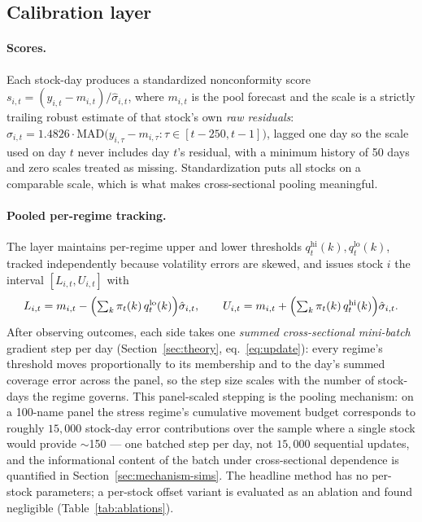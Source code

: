 \subsection{Calibration layer}

\paragraph{Scores.} Each stock-day produces a standardized nonconformity
score $s_{i,t} = (y_{i,t} - m_{i,t}) / \hat\sigma_{i,t}$, where $m_{i,t}$
is the pool forecast and the scale is a strictly trailing robust estimate
of that stock's own \emph{raw residuals}:
$\hat\sigma_{i,t} = 1.4826 \cdot \mathrm{MAD}\bigl( y_{i,\tau} - m_{i,\tau}
: \tau \in [t - 250, t - 1] \bigr)$, lagged one day so the scale used on
day $t$ never includes day $t$'s residual, with a minimum history of 50
days and zero scales treated as missing. Standardization puts all stocks
on a comparable scale, which is what makes cross-sectional pooling
meaningful.

\paragraph{Pooled per-regime tracking.} The layer maintains per-regime
upper and lower thresholds $q_t^{\mathrm{hi}}(k), q_t^{\mathrm{lo}}(k)$,
tracked independently because volatility errors are skewed, and issues
stock $i$ the interval $[L_{i,t}, U_{i,t}]$ with
\[
  L_{i,t} = m_{i,t} - \Bigl( \textstyle\sum_k \pi_t(k)\,
  q_t^{\mathrm{lo}}(k) \Bigr) \hat\sigma_{i,t},
  \qquad
  U_{i,t} = m_{i,t} + \Bigl( \textstyle\sum_k \pi_t(k)\,
  q_t^{\mathrm{hi}}(k) \Bigr) \hat\sigma_{i,t}.
\]
After observing outcomes, each side takes one \emph{summed
cross-sectional mini-batch} gradient step per day
(Section~\ref{sec:theory}, eq.~\eqref{eq:update}): every regime's
threshold moves proportionally to its membership and to the day's
summed coverage error across the panel, so the step size scales with
the number of stock-days the regime governs. This panel-scaled stepping
is the pooling mechanism: on a 100-name panel the stress regime's
cumulative movement budget corresponds to roughly $15{,}000$ stock-day
error contributions over the sample where a single stock would provide
$\sim$150 --- one batched step per day, not $15{,}000$ sequential
updates, and the informational content of the batch under
cross-sectional dependence is quantified in
Section~\ref{sec:mechanism-sims}. The headline
method has no per-stock parameters; a per-stock offset variant is
evaluated as an ablation and found negligible
(Table~\ref{tab:ablations}).

